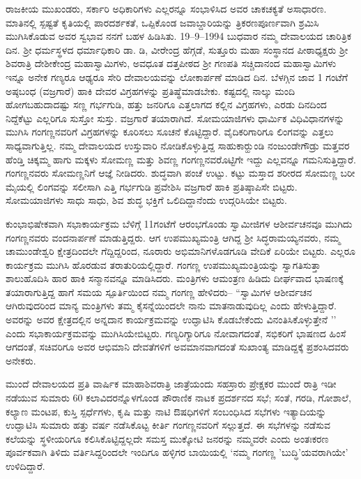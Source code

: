 ರಾಜಕೀಯ  ಮುಖಂಡರು,  ಸರ್ಕಾರಿ ಅಧಿಕಾರಿಗಳು ಎಲ್ಲರನ್ನೂ ಸಂಭಾಳಿಸಿದ ಅವರ ಚಾಕಚಕ್ಯತೆ ಅಸಾಧಾರಣ. ಮಾತಿನಲ್ಲಿ ಸ್ಪಷ್ಟತೆ ಕೃತಿಯಲ್ಲಿ ಪಾರದರ್ಶಕತೆ, ಒಪ್ಪಿಕೊಂಡ ಜವಾಬ್ದಾರಿಯನ್ನು ತ್ರಿಕರಣಪೂರ್ಣವಾಗಿ ಶ್ರಮಿಸಿ ಮುಗಿಸಿಕೊಡುವ ಅವರ ಸ್ವಭಾವ ನನಗೆ ಬಹಳ ಹಿಡಿಸಿತು. 19–9–1994 ಬುಧವಾರ ನಮ್ಮ ದೇವಾಲಯದ ಚಾರಿತ್ರಿಕ ದಿನ. ಶ್ರೀ ಧರ್ಮಸ್ಥಳದ ಧರ್ಮಾಧಿಕಾರಿ ಡಾ. ಡಿ, ವೀರೇಂದ್ರ ಹೆಗ್ಗಡೆ, ಸುತ್ತೂರು ಮಹಾ ಸಂಸ್ಥಾನದ ಪೀಠಾಧ್ಯಕ್ಷರು ಶ್ರೀ ಶಿವರಾತ್ರಿ ದೇಶೀಕೇಂದ್ರ ಮಹಾಸ್ವಾಮಿಗಳು, ಅವಧೂತ ದತ್ತಪೀಠದ ಶ್ರೀ ಗಣಪತಿ ಸಚ್ಚಿದಾನಂದ ಮಹಾಸ್ವಾಮಿಗಳು ಇನ್ನೂ ಅನೇಕ ಗಣ್ಯರೂ ಆಢ್ಯರೂ ಸೇರಿ ದೇವಾಲಯವನ್ನು ಲೋಕಾರ್ಪಣೆ ಮಾಡಿದ ದಿನ. ಬೆಳಗ್ಗಿನ ಜಾವ 1 ಗಂಟೆಗೆ ಅಷ್ಠಬಂಧ (ವಜ್ರಗಾರೆ) ಹಾಕಿ ದೇವರ ವಿಗ್ರಹಗಳನ್ನು ಪ್ರತಿಷ್ಥೆಮಾಡಬೇಕು. ಕಷ್ಟದಲ್ಲಿ ನಾಲ್ಕು ಮಂದಿ ಹೋಗಬಹುದಾದಷ್ಟು ಸಣ್ಣ ಗರ್ಭಗುಡಿ, ಹತ್ತು ಜನರಿಗೂ ಎತ್ತಲಾಗದ ಕಲ್ಲಿನ ವಿಗ್ರಹಗಳು, ಎರಡು ದಿನದಿಂದ ನಿದ್ದೆಕೆಟ್ಟು ಎಲ್ಲರಿಗೂ ಸುಸ್ತೋ ಸುಸ್ತು. ವಜ್ರಗಾರೆ ತಯಾರಾಗಿದೆ. ಸೋಮಯಾಜಿಗಳು ಧಾರ್ಮಿಕ ವಿಧಿವಿಧಾನಗಳನ್ನು ಮುಗಿಸಿ ಗಂಗಣ್ಣನವರಿಗೆ ವಿಗ್ರಹಗಳನ್ನು ಕೂರಿಸಲು ಸೂಚನೆ ಕೊಟ್ಟಿದ್ದಾರೆ. ವೈದಿಕರಿಗಾರಿಗೂ ಲಿಂಗವನ್ನು ಎತ್ತಲು ಸಾಧ್ಯವಾಗುತ್ತಿಲ್ಲ. ನಮ್ಮ ದೇವಾಲಯದ ಉಸ್ತುವಾರಿ ನೋಡಿಕೊಳ್ಳುತ್ತಿದ್ದ ಸಾಹುಕಾರ್‍ಹುಂಡಿ ನಂಜುಂಡೇಗೌಡ್ರು ಮತ್ತವರ ಹೆಂಡ್ತಿ ಚಿಕ್ಕಮ್ಮ ಹಾಗು ಮಕ್ಕಳು ಸೋಮಣ್ಣ ಮತ್ತು ಶಿವಣ್ಣ ಗಂಗಣ್ಣನವರೊಟ್ಟಿಗೇ ಇದ್ದು ಎಲ್ಲವನ್ನೂ ಗಮನಿಸುತ್ತಿದ್ದಾರೆ. ಗಂಗಣ್ಣನವರು ಸೋಮಣ್ಣನಿಗೆ ಆಜ್ಞೆ ನೀಡಿದರು. ಶುದ್ಧವಾಗಿ ಪಂಚೆ ಉಟ್ಟು. ಕಟ್ಟು ಮಸ್ತಾದ ಶರೀರದ ಸೋಮಣ್ಣ ಬರೀ ಮೈಯಲ್ಲಿ ಲಿಂಗವನ್ನು ಸಲೀಸಾಗಿ ಎತ್ತಿ ಗರ್ಭಗುಡಿ ಪ್ರವೇಶಿಸಿ ವಜ್ರಗಾರೆ ಹಾಕಿ ಪ್ರತಿಷ್ಠಾಪಿಸೇ ಬಿಟ್ಟರು. ಸೋಮಯಾಜಿಗಳು ಸಾಧು ಸಾಧು, ಶಿವ ಶುದ್ಧ ಭಕ್ತಿಗೆ ಒಲಿದಿದ್ದಾನೆಂದು ಉದ್ಗರಿಸಿಯೇ ಬಿಟ್ಟರು.

ಕುಂಭಾಭಿಷೇಕವಾಗಿ ಸಭಾಕಾರ್ಯಕ್ರಮ ಬೆಳಿಗ್ಗೆ 11ಗಂಟೆಗೆ ಆರಂಭಗೊಂಡು ಸ್ವಾಮೀಜಿಗಳ ಆಶೀರ್ವಚನವೂ ಮುಗಿದು ಗಂಗಣ್ಣನವರು ವಂದನಾರ್ಪಣೆ ಮಾಡುತ್ತಿದ್ದರು. ಆಗ ಉಪಮುಖ್ಯಮಂತ್ರಿ ಆಗಿದ್ದ ಶ್ರೀ ಸಿದ್ಧರಾಮಯ್ಯನವರು, ನಮ್ಮ ಚಾಮುಂಡೇಶ್ವರಿ ಕ್ಷೇತ್ರದಿಂದಲೇ ಗೆದ್ದಿದ್ದರಿಂದ, ನೂರಾರು ಅಭಿಮಾನಿಗಳೊಡಗೂಡಿ ವೇದಿಕೆ ಏರಿಯೇ ಬಿಟ್ಟರು. ಎಲ್ಲರೂ ಕಾರ್ಯಕ್ರಮ ಮುಗಿಸಿ ಹೊರಡುವ ತರಾತುರಿಯಲ್ಲಿದ್ದಾರೆ. ಗಂಗಣ್ಣ ಉಪಮುಖ್ಯಮಂತ್ರಿಯನ್ನು ಸ್ವಾಗತಿಸುತ್ತಾ ಶಾಲುಹೊದಿಸಿ ಹಾರ ಹಾಕಿ ಸನ್ಮಾನವನ್ನೂ ಮಾಡಿಸಿದರು. ಮಂತ್ರಿಗಳು ಆಮಂತ್ರಣ ಹಿಡಿದು ದೀರ್ಘವಾದ ಭಾಷಣಕ್ಕೆ ತಯಾರಾಗುತ್ತಿದ್ದ ಹಾಗೆ ಸಮಯ ಸ್ಪೂರ್ತಿಯಿಂದ ನಮ್ಮ ಗಂಗಣ್ಣ ಹೇಳಿದರು– “ಸ್ವಾಮಿಗಳ ಆಶೀರ್ವಚನ ಆಗಿರುವುದರಿಂದ ಮಾನ್ಯ ಮಂತ್ರಿಗಳು ತಮ್ಮ ಕೈಸನ್ನೆಯಿಂದಲೇ ನಾನು ಮಾತನಾಡುವುದಿಲ್ಲ ಎಂದು ಹೇಳುತ್ತಿದ್ದಾರೆ. ಅವರನ್ನು ಅವರ ಕ್ಷೇತ್ರದಲ್ಲಿನ ಅನ್ನದಾನ ಕಾರ್ಯಕ್ರಮವನ್ನು ಉದ್ಘಾಟಿಸಿ ಕೊಡಬೇಕೆಂದು ವಿನಂತಿಸಿಕೊಳ್ಳುತ್ತೇನೆ ’’ ಎಂದು ಸಭಾಕಾರ್ಯಕ್ರಮವನ್ನು ಮುಗಿಸಿಯೇಬಿಟ್ಟರು. ಗಣ್ಯರಿಗ್ಯಾರಿಗೂ ನೋವಾಗದಂತೆ, ಸಭಿಕರಿಗೆ ಭಾಷಣದ ಹಿಂಸೆ ಆಗದಂತೆ, ಸಚಿವರಿಗೂ ಅವರ ಆಭಿಮಾನಿ ದೇವತೆಗಳಿಗೆ ಅವಮಾನವಾಗದಂತೆ ಸುಖಾಂತ್ಯ ಮಾಡಿದ್ದಕ್ಕೆ ಪ್ರಶಂಸಿದವರು ಅನೇಕರು.

ಮುಂದೆ ದೇವಾಲಯದ ಪ್ರತಿ ವಾರ್ಷಿಕ ಮಾಹಾಶಿವರಾತ್ರಿ ಜಾತ್ರೆಯಂದು ಸಹಸ್ರಾರು ಪ್ರೇಕ್ಷಕರ ಮುಂದೆ ರಾತ್ರಿ ಇಡೀ ನಡೆಯುವ ಸುಮಾರು 60 ಕಲಾವಿದರನ್ನೊಳಗೊಂಡ ಪೌರಾಣಿಕ ನಾಟಕ ಪ್ರದರ್ಶನದ ಸಭೆ;  ಸಂತೆ, ಗರಡಿ, ಗೋಶಾಲೆ, ಕಲ್ಯಾಣ ಮಂಟಪ, ಕುಸ್ತಿ ಸ್ಪರ್ಧೆಗಳು, ಕೃಷಿ ಮತ್ತು ನಾಟಿ ಔಷಧಿಗಳಿಗೆ ಸಂಬಂಧಿಸಿದ ಸಭೆಗಳು ಇತ್ಯಾದಿಯನ್ನು ಉದ್ಘಾಟಿಸಿ ಸುಮಾರು ಹತ್ತು ವರ್ಷ ನಡೆಸಿಕೊಟ್ಟ ಕೀರ್ತಿ ಗಂಗಣ್ಣನವರಿಗೆ ಸಲ್ಲುತ್ತದೆ. ಈ ಸಭೆಗಳನ್ನು ನಡೆಸುವ ಕಲೆಯನ್ನು ಸ್ಥಳೀಯರಿಗೂ ಕಲಿಸಿಕೊಟ್ಟಿದ್ದಲ್ಲದೇ ಸಮಸ್ತ ಮುಕ್ಕೋಟಿ ಜನರನ್ನು ನಮ್ಮವರೇ ಎಂದು ಅಂತಃಕರಣ ಪೂರ್ವಕವಾಗಿ ತಿಳಿದು ವರ್ತಿಸಿದ್ದರಿಂದಲೇ ಇಂದಿಗೂ ಹಳ್ಳಿಗರ ಬಾಯಿಯಲ್ಲಿ `ನಮ್ಮ ಗಂಗಣ್ಣ ’ಬುದ್ಧಿ’ಯವರಾಗಿಯೇ’ ಉಳಿದಿದ್ದಾರೆ.

